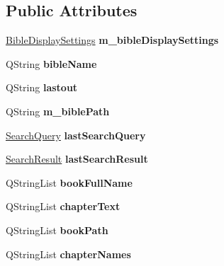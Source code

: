 \subsection*{Public Attributes}
\begin{DoxyCompactItemize}
\item 
\hypertarget{classBible_a61a3a3f88bdc01c6c7a493bdcbd98903}{
\hyperlink{classBibleDisplaySettings}{BibleDisplaySettings} {\bfseries m\_\-bibleDisplaySettings}}
\label{classBible_a61a3a3f88bdc01c6c7a493bdcbd98903}

\item 
\hypertarget{classBible_a99e0cb6707bad5e1a25d2d360e3f3c1d}{
QString {\bfseries bibleName}}
\label{classBible_a99e0cb6707bad5e1a25d2d360e3f3c1d}

\item 
\hypertarget{classBible_aabb92e73cdb26638d40325e5d708ec7b}{
QString {\bfseries lastout}}
\label{classBible_aabb92e73cdb26638d40325e5d708ec7b}

\item 
\hypertarget{classBible_a1287eeedb0130dcc2b9e9cea653bb4dd}{
QString {\bfseries m\_\-biblePath}}
\label{classBible_a1287eeedb0130dcc2b9e9cea653bb4dd}

\item 
\hypertarget{classBible_a1b406912e4d01a4e4755b17a6b2b3893}{
\hyperlink{classSearchQuery}{SearchQuery} {\bfseries lastSearchQuery}}
\label{classBible_a1b406912e4d01a4e4755b17a6b2b3893}

\item 
\hypertarget{classBible_a62899d799a8c6efcf5283808edb205a7}{
\hyperlink{classSearchResult}{SearchResult} {\bfseries lastSearchResult}}
\label{classBible_a62899d799a8c6efcf5283808edb205a7}

\item 
\hypertarget{classBible_ac3d84e689a0365415980d6f3ebb6e561}{
QStringList {\bfseries bookFullName}}
\label{classBible_ac3d84e689a0365415980d6f3ebb6e561}

\item 
\hypertarget{classBible_af1659c6f7db752f7c722c7880a731957}{
QStringList {\bfseries chapterText}}
\label{classBible_af1659c6f7db752f7c722c7880a731957}

\item 
\hypertarget{classBible_afcf35e16bb50b3be1d60ee74b3f8a48c}{
QStringList {\bfseries bookPath}}
\label{classBible_afcf35e16bb50b3be1d60ee74b3f8a48c}

\item 
\hypertarget{classBible_a21d4ae1646b7a8c816094bcbbec4bc88}{
QStringList {\bfseries chapterNames}}
\label{classBible_a21d4ae1646b7a8c816094bcbbec4bc88}


\end{DoxyCompactItemize}
